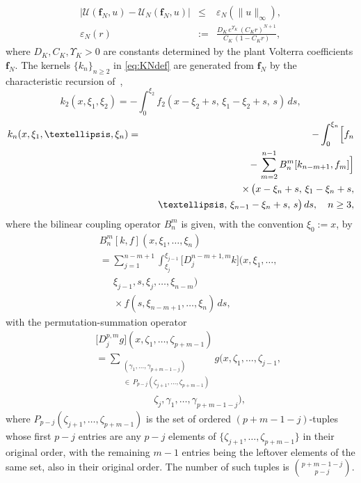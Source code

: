 \documentclass[10pt,a4paper]{amsart}
\newcommand{\eps}{\varepsilon}
\begin{document}
\begin{eqnarray}
|\mathcal{U}(\mathbf{f}_N, u) - \mathcal{U}_N(\mathbf{f}_N, u)| &\le& \eps_N(\|u\|_\infty), \nonumber \\
\eps_N(r) &:=& \frac{D_K\, e^{\Upsilon_K}\, (C_K r)^{N+1}}{C_K\,(1 - C_K r)},
\label{eq:epsN-def}
\end{eqnarray}
where $D_K, C_K, \Upsilon_K > 0$ are constants determined by the plant Volterra coefficients $\mathbf{f}_N$. The kernels $\{k_n\}_{n\ge 2}$ in \eqref{eq:KNdef} are generated from $\mathbf{f}_N$ by the characteristic recursion of~\cite{krstic2026feedbacklinearizationhyperbolicpdes},
\begin{equation}
k_2(x,\xi_1,\xi_2) = -\int_0^{\xi_2} f_2(x-\xi_2+s,\, \xi_1-\xi_2+s,\, s)\, ds,
\label{eq:k2def}
\end{equation}
\begin{eqnarray}
k_n(x,\xi_1,\ldots,\xi_n) &=& -\int_0^{\xi_n}\Bigl[f_n \nonumber \\
&& -\, \sum_{m=2}^{n-1} B_n^m[k_{n-m+1},f_m]\Bigr] \nonumber \\
&& \times\, \bigl(x-\xi_n+s,\, \xi_1-\xi_n+s, \nonumber \\
&& \quad \ldots,\, \xi_{n-1}-\xi_n+s,\, s\bigr)\, ds, \quad n\ge 3,
\label{eq:kndef}
\end{eqnarray}
where the bilinear coupling operator $B_n^m$ is given, with the convention $\xi_0 := x$, by
\begin{eqnarray}
&& B_n^m[k,f](x,\xi_1,\ldots,\xi_n) \nonumber \\
&& = \sum_{j=1}^{n-m+1}\int_{\xi_j}^{\xi_{j-1}}
\bigl[D_j^{n-m+1,m} k\bigr](x,\xi_1,\ldots, \nonumber \\
&& \quad\ \ \xi_{j-1},s,\xi_j,\ldots,\xi_{n-m}) \nonumber \\
&& \quad\ \ \times f(s,\xi_{n-m+1},\ldots,\xi_n)\,ds,
\label{eq:Bdef}
\end{eqnarray}
with the permutation-summation operator
\begin{eqnarray}
&& \bigl[D_j^{p,m}g\bigr](x,\zeta_1,\ldots,\zeta_{p+m-1}) \nonumber \\
&& = \!\!\!\sum_{\substack{(\gamma_1,\ldots,\gamma_{p+m-1-j}) \\ \in\, P_{p-j}(\zeta_{j+1},\ldots,\zeta_{p+m-1})}}\!\!\!
g(x,\zeta_1,\ldots,\zeta_{j-1}, \nonumber \\
&& \qquad\qquad\qquad \zeta_j,\gamma_1,\ldots,\gamma_{p+m-1-j}),
\label{eq:Ddef}
\end{eqnarray}
where $P_{p-j}(\zeta_{j+1},\ldots,\zeta_{p+m-1})$ is the set of ordered $(p+m-1-j)$-tuples whose first $p-j$ entries are any $p-j$ elements of $\{\zeta_{j+1},\ldots,\zeta_{p+m-1}\}$ in their original order, with the remaining $m-1$ entries being the leftover elements of the same set, also in their original order. The number of such tuples is $\binom{p+m-1-j}{p-j}$.
\end{document}
